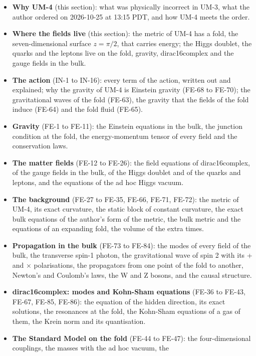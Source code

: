 \documentclass[
  10pt,
]{article}
\providecommand{\tightlist}{%
  \setlength{\itemsep}{0pt}\setlength{\parskip}{0pt}}
\begin{document}
\begin{itemize}
\tightlist
\item
  \textbf{Why UM-4} (this section): what was physically incorrect in
  UM-3, what the author ordered on 2026-10-25 at 13:15 PDT, and how UM-4
  meets the order.
\item
  \textbf{Where the fields live} (this section): the metric of UM-4 has
  a fold, the seven-dimensional surface \(z = \pi/2\), that carries
  energy; the Higgs doublet, the quarks and the leptons live on the
  fold, gravity, dirac16complex and the gauge fields in the bulk.
\item
  \textbf{The action} (IN-1 to IN-16): every term of the action, written
  out and explained; why the gravity of UM-4 is Einstein gravity (FE-68
  to FE-70); the gravitational waves of the fold (FE-63), the gravity
  that the fields of the fold induce (FE-64) and the fold fluid (FE-65).
\item
  \textbf{Gravity} (FE-1 to FE-11): the Einstein equations in the bulk,
  the junction condition at the fold, the energy-momentum tensor of
  every field and the conservation laws.
\item
  \textbf{The matter fields} (FE-12 to FE-26): the field equations of
  dirac16complex, of the gauge fields in the bulk, of the Higgs doublet
  and of the quarks and leptons, and the equations of the ad hoc Higgs
  vacuum.
\item
  \textbf{The background} (FE-27 to FE-35, FE-66, FE-71, FE-72): the
  metric of UM-4, its exact curvature, the static block of constant
  curvature, the exact bulk equations of the author's form of the
  metric, the bulk metric and the equations of an expanding fold, the
  volume of the extra times.
\item
  \textbf{Propagation in the bulk} (FE-73 to FE-84): the modes of every
  field of the bulk, the transverse spin-1 photon, the gravitational
  wave of spin 2 with its + and \(\times\) polarisations, the
  propagators from one point of the fold to another, Newton's and
  Coulomb's laws, the W and Z bosons, and the causal structure.
\item
  \textbf{dirac16complex: modes and Kohn-Sham equations} (FE-36 to
  FE-43, FE-67, FE-85, FE-86): the equation of the hidden direction, its
  exact solutions, the resonances at the fold, the Kohn-Sham equations
  of a gas of them, the Krein norm and its quantisation.
\item
  \textbf{The Standard Model on the fold} (FE-44 to FE-47): the
  four-dimensional couplings, the masses with the ad hoc vacuum, the

\end{itemize}
\end{document}
